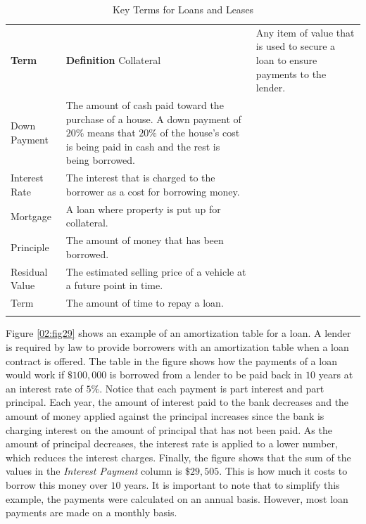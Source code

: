 \begin{table}[H]
	{\small
		\begin{longtable}{L{0.75in}L{3.50in}} %
			\textbf{Term} & \textbf{Definition} \endhead
			\hline
			Collateral & Any item of value that is used to secure a loan to ensure payments to the lender.\\
			Down Payment & The amount of cash paid toward the purchase of a house. A down payment of $ 20\% $ means that $ 20\% $ of the house's cost is being paid in cash and the rest is being borrowed.\\
			Interest Rate & The interest that is charged to the borrower as a cost for borrowing money.\\
			Mortgage & A loan where property is put up for collateral.\\
			Principle & The amount of money that has been borrowed.\\
			Residual Value & The estimated selling price of a vehicle at a future point in time.\\
			Term & The amount of time to repay a loan.\\
			\caption{Key Terms for Loans and Leases}
			\label{02:tab05}
		\end{longtable}
	} %
\end{table}

Figure \ref{02:fig29} shows an example of an amortization table for a loan. A lender is required by law to provide borrowers with an amortization table when a loan contract is offered. The table in the figure shows how the payments of a loan would work if $ \$100,000 $ is borrowed from a lender to be paid back in $ 10 $ years at an interest rate of $ 5\% $. Notice that each payment is part interest and part principal. Each year, the amount of interest paid to the bank decreases and the amount of money applied against the principal increases since the bank is charging interest on the amount of principal that has not been paid. As the amount of principal decreases, the interest rate is applied to a lower number, which reduces the interest charges. Finally, the figure shows that the sum of the values in the \textit{Interest Payment} column is $ \$29,505 $. This is how much it costs to borrow this money over $ 10 $ years. It is important to note that to simplify this example, the payments were calculated on an annual basis. However, most loan payments are made on a monthly basis.

